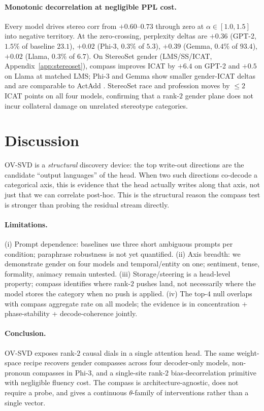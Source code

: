\paragraph{Monotonic decorrelation at negligible PPL cost.} Every
model drives stereo corr from $+0.60\text{--}0.73$ through zero
at $\alpha\in[1.0, 1.5]$ into negative territory. At the
zero-crossing, perplexity deltas are $+0.36$ (GPT-2, $1.5\%$ of
baseline $23.1$), $+0.02$ (Phi-3, $0.3\%$ of $5.3$),
$+0.39$ (Gemma, $0.4\%$ of $93.4$), $+0.02$ (Llama, $0.3\%$ of $6.7$).
On StereoSet gender (LMS/SS/ICAT, Appendix~\ref{app:stereoset}),
compass improves ICAT by $+6.4$ on GPT-2 and $+0.5$ on Llama at
matched LMS; Phi-3 and Gemma show smaller gender-ICAT deltas and
are comparable to ActAdd \citep{turner2023actadd}. StereoSet race
and profession moves by $\le 2$ ICAT points on all four models,
confirming that a rank-$2$ gender plane does not incur collateral
damage on unrelated stereotype categories.

\section{Discussion}
\label{sec:discussion}

OV-SVD is a \emph{structural} discovery device: the top write-out
directions are the candidate ``output languages'' of the head.
When two such directions co-decode a categorical axis, this is
evidence that the head actually writes along that axis, not just
that we can correlate post-hoc. This is the structural reason the
compass test is stronger than probing the residual stream directly.

\paragraph{Limitations.} (i) Prompt dependence: baselines use three
short ambiguous prompts per condition; paraphrase robustness is not
yet quantified. (ii) Axis breadth: we demonstrate gender on four
models and temporal/entity on one; sentiment, tense, formality,
animacy remain untested. (iii) Storage/steering is a head-level
property; compass identifies where rank-$2$ pushes land, not
necessarily where the model stores the category when no push is
applied. (iv) The top-$4$ null overlaps with compass aggregate rate
on all models; the evidence is in concentration + phase-stability +
decode-coherence jointly.

\paragraph{Conclusion.} OV-SVD exposes rank-$2$ causal dials in a
single attention head. The same weight-space recipe recovers gender
compasses across four decoder-only models, non-pronoun compasses in
Phi-3, and a single-site rank-$2$ bias-decorrelation primitive with
negligible fluency cost. The compass is architecture-agnostic, does
not require a probe, and gives a continuous $\theta$-family of
interventions rather than a single vector.
